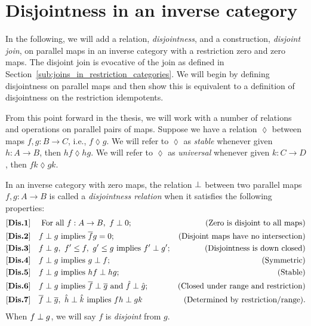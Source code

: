 \section{Disjointness in an inverse category} %
\label{sec:disjointness_in_an_inverse_category}
In the following, we will add a relation, \emph{disjointness}, and a construction, \emph{disjoint
  join}, on parallel maps in  an inverse category with a restriction
zero and zero maps. The disjoint join is evocative of the join as defined in
Section~\ref{sub:joins_in_restriction_categories}. We will begin by defining disjointness on
parallel maps and then show this is equivalent to a definition of disjointness on the restriction
idempotents.

From this point forward in the thesis, we will work with a number of relations and operations on
parallel pairs of maps. Suppose we have a relation $\lozenge$ between maps $f,g:B\to C$, i.e., $f
\lozenge g$. We will refer to $\lozenge$ as \emph{stable} whenever given $h:A \to B$, then $h f
\lozenge h g$. We will refer to $\lozenge$ as \emph{universal} whenever given $k:C \to D$, then $f
k \lozenge g k$.


\begin{definition}\label{def:disjointness_relation}
  In an inverse category \X with zero maps, the relation $\perp$ between two parallel
  maps $f, g:A \to B$ is called a \emph{disjointness relation} when it satisfies the following
  properties:
  \begin{align*}
    \axiom{Dis}{1}\quad &\text{ For all }f:A\to B,\ f\cdperp 0;&\text{(Zero is disjoint to all maps)}\\
    \axiom{Dis}{2}\quad &f\cdperp g\text{ implies }\rst{f} g = 0; &\text{(Disjoint maps have no intersection)}\\
    \axiom{Dis}{3}\quad &f\cdperp g,\ f' \le f,\ g' \le g\text{ implies }f' \cdperp
    g';&\text{(Disjointness is down closed)}\\
    \axiom{Dis}{4}\quad &f\cdperp g\text{ implies }g \cdperp f; &\text{(Symmetric)}\\
    \axiom{Dis}{5}\quad &f\cdperp g\text{ implies }h f \cdperp h g; &\text{(Stable)}\\
    \axiom{Dis}{6}\quad &f\cdperp g\text{ implies }\rst{f} \cdperp \rst{g}
      \text{ and }\rg{f}\cdperp\rg{g}; &\text{(Closed under range and restriction)}\\
    \axiom{Dis}{7}\quad &\rst{f}\cdperp \rst{g},\ \rg{h}\cdperp \rg{k}\text{ implies }f h
      \cdperp g k &\text{(Determined by restriction/range).}
  \end{align*}
  When $f\perp g$, we will say $f$ is \emph{disjoint} from $g$.
\end{definition}

